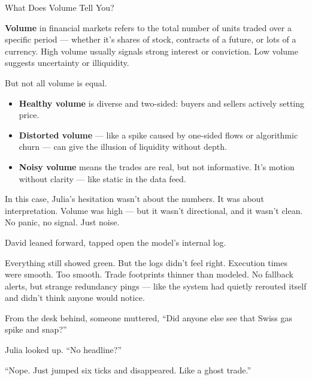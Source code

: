 \begin{TechnicalSidebar}{What Does Volume Tell You?}

  \textbf{Volume} in financial markets refers to the total number of units traded over a specific period — whether it's 
  shares of stock, contracts of a future, or lots of a currency. High volume usually signals strong interest or 
  conviction. Low volume suggests uncertainty or illiquidity.
  
  \medskip
  
  But not all volume is equal.
  
  \begin{itemize}
    \item \textbf{Healthy volume} is diverse and two-sided: buyers and sellers actively setting price.
    \item \textbf{Distorted volume} — like a spike caused by one-sided flows or algorithmic churn — can give the illusion 
    of liquidity without depth.
    \item \textbf{Noisy volume} means the trades are real, but not informative. It’s motion without clarity — like static 
    in the data feed.
  \end{itemize}
  
  \medskip
  
  In this case, Julia’s hesitation wasn’t about the numbers. It was about interpretation. Volume was high — but it wasn’t 
  directional, and it wasn’t clean. No panic, no signal. Just noise.
  
\end{TechnicalSidebar}

\medskip


David leaned forward, tapped open the model’s internal log.

Everything still showed green.
But the logs didn’t feel right.
Execution times were smooth. Too smooth.
Trade footprints thinner than modeled.
No fallback alerts, but strange redundancy pings — like the system had quietly rerouted itself and didn’t think anyone 
would notice.

From the desk behind, someone muttered, “Did anyone else see that Swiss gas spike and snap?”

Julia looked up. “No headline?”

“Nope. Just jumped six ticks and disappeared. Like a ghost trade.”

\medskip

